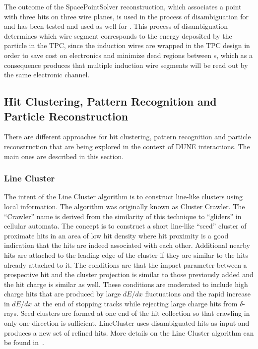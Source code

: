 The outcome of the SpacePointSolver reconstruction, which associates a \threed point with three hits on three wire planes, is used in the process of disambiguation for  and has been tested and used as well for . This process of disambiguation determines which wire segment corresponds to the energy deposited by the particle in the TPC, since the induction wires are wrapped in the  TPC design in order to save cost on electronics and minimize dead regions between s, which as a consequence produces that multiple induction wire segments will be read out by the same electronic channel.





\subsection{Hit Clustering, Pattern Recognition and Particle Reconstruction}

There are different approaches for hit clustering, pattern recognition and particle reconstruction that are being explored in the context of DUNE  interactions. The main ones are described in this section.  

\subsubsection{Line Cluster}\label{sec:LineCluster}
The intent of the Line Cluster algorithm is to construct \twod line-like clusters using local information. The algorithm was originally known as Cluster Crawler. The ``Crawler'' name is derived from the similarity of this technique to ``gliders'' in \twod cellular automata. The concept is to construct a short line-like ``seed'' cluster of proximate hits in an area of low hit density where hit proximity is a good indication that the hits are indeed associated with each other. Additional nearby hits are attached to the leading edge of the cluster if they are similar to the hits already attached to it. The conditions are that the impact parameter between a prospective hit and the cluster projection is similar to those previously added and the hit charge is similar as well. These conditions are moderated to include high charge hits that are produced by large $dE/dx$ fluctuations and the rapid increase in $dE/dx$ at the end of stopping tracks while rejecting large charge hits from $\delta$-rays.
Seed clusters are formed at one end of the hit collection so that crawling in only one direction is sufficient. LineCluster uses disambiguated %
hits as input and produces a new set of refined hits. More details on the Line Cluster algorithm can be found in~\cite{ref:linecluster}.

